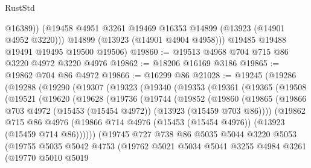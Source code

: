 \begin{lexlean}{RustStd}
\begin{coremodule}
            @16389))
        (@19458 @4951 @3261 @19469 @16353 @14899 (@13923 (@14901 @4952 @3220)))
        @14899
        (@13923 (@14901 @4904 @4958)))
      @19485
      @19488
      @19491
      @19495
      @19500
      @19506)
@19860 := @19513 @4968 @704 @715 @86 @3220 @4972 @3220 @4976
@19862 := @18206 @16169 @3186
@19865 := @19862 @704 @86 @4972
@19866 := @16299 @86
@21028 := @19245
    (@19286
      (@19288
        (@19290
          (@19307
            (@19323
              (@19340
                (@19353
                  (@19361
                    (@19365
                      (@19508
                        (@19521
                          (@19620
                            (@19628
                              (@19736
                                (@19744
                                  (@19852
                                    (@19860
                                      (@19865
                                        (@19866
                                          @703
                                          @4972
                                          (@15453 (@15454 @4972))
                                          (@13923 (@15459 @703 @86))))
                                      (@19862
                                        @715
                                        @86
                                        @4976
                                        (@19866
                                          @714
                                          @4976
                                          (@15453 (@15454 @4976))
                                          (@13923 (@15459 @714 @86))))))
                                  (@19745
                                    @727
                                    @738
                                    @86
                                    @5035
                                    @5044
                                    @3220
                                    @5053
                                    (@19755
                                      @5035
                                      @5042
                                      @4753
                                      (@19762
                                        @5021
                                        @5034
                                        @5041
                                        @3255
                                        @4984
                                        @3261
                                        (@19770
                                          @5010
                                          @5019

\end{coremodule}
\end{lexlean}
